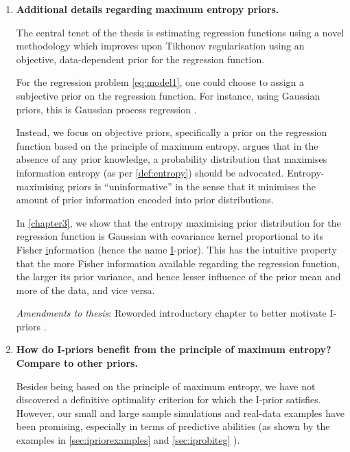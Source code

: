 \documentclass[11pt,showframe,twoside,openright]{report}
\begin{document}
\begin{enumerate}
  \item \textbf{Additional details regarding maximum entropy priors.}
  
  The central tenet of the thesis is estimating regression functions using a novel methodology which improves upon Tikhonov regularisation using an objective, data-dependent prior for the regression function.
  
  For the regression problem \cref{eq:model1}, one could choose to assign a subjective prior on the regression function.
  For instance, using Gaussian priors, this is Gaussian process regression \citep{rasmussen2006gaussian}.
  
  Instead, we focus on objective priors, specifically a prior on the regression function based on the principle of maximum entropy.
  \citet{jaynes1957a,jaynes1957b,jaynes2003probability} argues that in the absence of any prior knowledge, a probability distribution that maximises information entropy (as per \cref{def:entropy}) should be advocated.
  Entropy-maximising priors is ``uninformative'' in the sense that it minimises the amount of prior information encoded into prior distributions.
  
  In \cref{chapter3}, we show that the entropy maximising prior distribution for the regression function is Gaussian with covariance kernel proportional to its Fisher \underline{i}nformation (hence the name \underline{I}-prior).
  This has the intuitive property that the more Fisher information available regarding the regression function, the larger its prior variance, and hence lesser influence of the prior mean and more of the data, and vice versa.
  
  \textit{Amendments to thesis}: Reworded introductory chapter to better motivate I-priors .
    
  \item \textbf{How do I-priors benefit from the principle of maximum entropy? Compare to other priors.}
  
  Besides being based on the principle of maximum entropy, we have not discovered a definitive optimality criterion for which the I-prior satisfies.
  However, our small and large sample simulations and real-data examples have been promising, especially in terms of predictive abilities (as shown by the examples in \cref{sec:ipriorexamples}  and \cref{sec:iprobiteg} ).
  

\end{enumerate}
\end{document}
